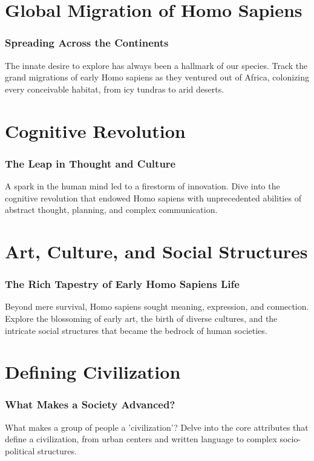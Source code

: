 \documentclass[a4paper,12pt]{book}
\begin{document}
\chapter{Global Migration of Homo Sapiens}
\subsection*{Spreading Across the Continents}
The innate desire to explore has always been a hallmark of our species. Track the grand migrations of early Homo sapiens as they ventured out of Africa, colonizing every conceivable habitat, from icy tundras to arid deserts.

\chapter{Cognitive Revolution}
\subsection*{The Leap in Thought and Culture}
A spark in the human mind led to a firestorm of innovation. Dive into the cognitive revolution that endowed Homo sapiens with unprecedented abilities of abstract thought, planning, and complex communication.

\chapter{Art, Culture, and Social Structures}
\subsection*{The Rich Tapestry of Early Homo Sapiens Life}
Beyond mere survival, Homo sapiens sought meaning, expression, and connection. Explore the blossoming of early art, the birth of diverse cultures, and the intricate social structures that became the bedrock of human societies.

\chapter{Defining Civilization}
\subsection*{What Makes a Society Advanced?}
What makes a group of people a 'civilization'? Delve into the core attributes that define a civilization, from urban centers and written language to complex socio-political structures.
\end{document}
